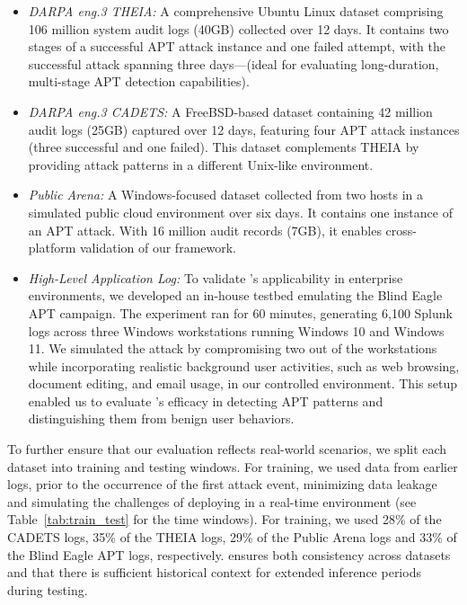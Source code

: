 \begin{itemize}[leftmargin=*,noitemsep]
    \item \textit{DARPA eng.3 THEIA:} A comprehensive Ubuntu Linux dataset comprising 106 million system audit logs (40GB) collected over 12 days. 
    It contains two stages of a successful APT attack instance and one failed attempt, with the successful attack spanning three days—(ideal for evaluating long-duration, multi-stage APT detection capabilities).

    \item \textit{DARPA eng.3 CADETS:} A FreeBSD-based dataset containing 42 million audit logs (25GB) captured over 12 days, featuring four APT attack instances (three successful and one failed). This dataset complements THEIA by providing attack patterns in a different Unix-like environment.

    \item \textit{Public Arena:} A Windows-focused dataset collected from two hosts in a simulated public cloud environment over six days. It contains one instance of an APT attack. With 16 million audit records (7GB), it enables cross-platform validation of our framework. 

    \item \textit{High-Level Application Log:}
To validate \method's applicability in enterprise environments, we developed an in-house testbed emulating the Blind Eagle APT campaign. 
The experiment ran for 60 minutes, generating 6,100 Splunk logs across three Windows workstations running Windows 10 and Windows 11. 
We simulated the attack by compromising two out of the workstations while incorporating realistic background user activities, such as web browsing, document editing, and email usage, in our controlled environment. 
This setup enabled us to evaluate \method's efficacy in detecting APT patterns and distinguishing them from benign user behaviors.
\end{itemize}

To further ensure that our evaluation reflects real-world scenarios, we split each dataset into training and testing windows. 
For training, we used data from earlier logs, prior to the occurrence of the first attack event, minimizing data leakage and simulating the challenges of deploying \method in a real-time environment (see Table~\ref{tab:train_test} for the time windows). 
For training, we used 28\% of the CADETS logs, 35\% of the THEIA logs, 29\% of the Public Arena logs and 33\% of the Blind Eagle APT logs, respectively. 
ensures both consistency across datasets and that there is sufficient historical context for extended inference periods during testing.


